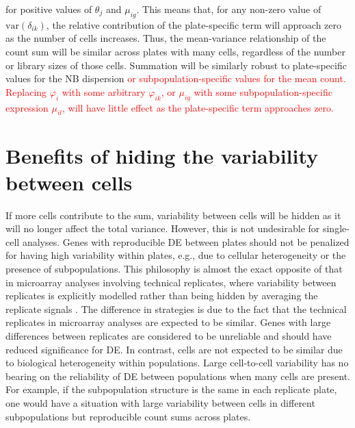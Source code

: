 \documentclass{article}
\newcommand\revised[1]{\textcolor{red}{#1}}
\begin{document}
for positive values of $\theta_j$ and $\mu_{ig}$.
This means that, for any non-zero value of $\mbox{var}(\delta_{ik})$, the relative contribution of the plate-specific term will approach zero as the number of cells increases.
Thus, the mean-variance relationship of the count sum will be similar across plates with many cells, regardless of the number or library sizes of those cells.
Summation will be similarly robust to plate-specific values for the NB dispersion \revised{or subpopulation-specific values for the mean count.
Replacing $\varphi_i$ with some arbitrary $\varphi_{ik}$, or $\mu_{ig}$ with some subpopulation-specific expression $\mu_{il}$, will have little effect as the plate-specific term approaches zero.}




\section{Benefits of hiding the variability between cells}
If more cells contribute to the sum, variability between cells will be hidden as it will no longer affect the total variance.
However, this is not undesirable for single-cell analyses.
Genes with reproducible DE between plates should not be penalized for having high variability within plates, e.g., due to cellular heterogeneity or the presence of subpopulations.
This philosophy is almost the exact opposite of that in microarray analyses involving technical replicates,
    where variability between replicates is explicitly modelled rather than being hidden by averaging the replicate signals \citep{smyth2005use}.
The difference in strategies is due to the fact that the technical replicates in microarray analyses are expected to be similar.
Genes with large differences between replicates are considered to be unreliable and should have reduced significance for DE.
In contrast, cells are not expected to be similar due to biological heterogeneity within populations.
Large cell-to-cell variability has no bearing on the reliability of DE between populations when many cells are present.
For example, if the subpopulation structure is the same in each replicate plate, one would have a situation with large variability between cells in different subpopulations but reproducible count sums across plates.
\end{document}
